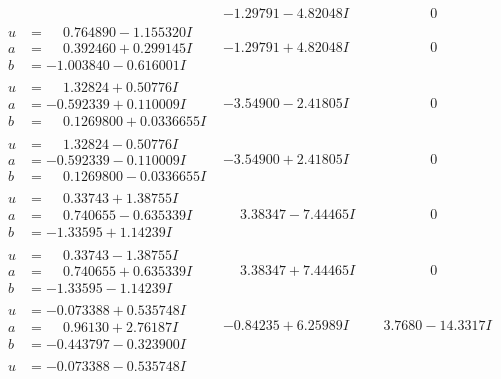 \documentclass[1p]{elsarticle_modified}
\theoremstyle{definition}
\begin{document}
$$\begin{array}{c|c|c}
 & -1.29791 - 4.82048 I & \phantom{-0.000000 } 0 \\ \hline\begin{aligned}
u &= \phantom{-}0.764890 - 1.155320 I \\
a &= \phantom{-}0.392460 + 0.299145 I \\
b &= -1.003840 - 0.616001 I\end{aligned}
 & -1.29791 + 4.82048 I & \phantom{-0.000000 } 0 \\ \hline\begin{aligned}
u &= \phantom{-}1.32824 + 0.50776 I \\
a &= -0.592339 + 0.110009 I \\
b &= \phantom{-}0.1269800 + 0.0336655 I\end{aligned}
 & -3.54900 - 2.41805 I & \phantom{-0.000000 } 0 \\ \hline\begin{aligned}
u &= \phantom{-}1.32824 - 0.50776 I \\
a &= -0.592339 - 0.110009 I \\
b &= \phantom{-}0.1269800 - 0.0336655 I\end{aligned}
 & -3.54900 + 2.41805 I & \phantom{-0.000000 } 0 \\ \hline\begin{aligned}
u &= \phantom{-}0.33743 + 1.38755 I \\
a &= \phantom{-}0.740655 - 0.635339 I \\
b &= -1.33595 + 1.14239 I\end{aligned}
 & \phantom{-}3.38347 - 7.44465 I & \phantom{-0.000000 } 0 \\ \hline\begin{aligned}
u &= \phantom{-}0.33743 - 1.38755 I \\
a &= \phantom{-}0.740655 + 0.635339 I \\
b &= -1.33595 - 1.14239 I\end{aligned}
 & \phantom{-}3.38347 + 7.44465 I & \phantom{-0.000000 } 0 \\ \hline\begin{aligned}
u &= -0.073388 + 0.535748 I \\
a &= \phantom{-}0.96130 + 2.76187 I \\
b &= -0.443797 - 0.323900 I\end{aligned}
 & -0.84235 + 6.25989 I & \phantom{-}3.7680 - 14.3317 I \\ \hline\begin{aligned}
u &= -0.073388 - 0.535748 I \\

\end{aligned}
\end{array}$$
\end{document}
